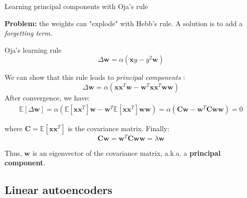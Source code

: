\documentclass[handout]{beamer}
\begin{document}
  \begin{frame}{Learning principal components with Oja's rule}

    \textbf{Problem:} the weights can "explode" with Hebb's rule. A solution is to add a \emph{forgetting term}.
    \pause

    \begin{block}{Oja's learning rule \cite{Oja1982}}
      \begin{equation*}
        \Delta \mathbf{w} = \alpha (\mathbf{x} y - y^2 \mathbf{w})
      \end{equation*}
    \end{block}
    \pause
    \scriptsize{
    We can show that this rule leads to \emph{principal components} \cite{Becker1991,Oja1992}: 
    \vspace{0cm}
    \begin{equation*}
      \Delta \mathbf{w} = \alpha (\mathbf{x} \mathbf{x}^T \mathbf{w} - \mathbf{w}^T \mathbf{x} \mathbf{x}^T \mathbf{w} \mathbf{w})
    \end{equation*}
    After convergence, we have:
    \begin{align*}
      \mathbb{E}\left[\Delta \mathbf{w}\right] = \alpha (\mathbb{E}\left[\mathbf{x} \mathbf{x}^T\right] \mathbf{w} - \mathbf{w}^T \mathbb{E}\left[\mathbf{x} \mathbf{x}^T\right] \mathbf{w} \mathbf{w}) = \alpha (\mathbf{C} \mathbf{w} - \mathbf{w}^T \mathbf{C} \mathbf{w} \mathbf{w}) = 0
    \end{align*}
    
    where $\mathbf{C} = \mathbb{E}\left[\mathbf{x} \mathbf{x}^T\right]$ is the covariance matrix. Finally:
    \vspace{0cm}
    \begin{equation*}
      \mathbf{C} \mathbf{w} = \mathbf{w}^T \mathbf{C} \mathbf{w} \mathbf{w} = \lambda \mathbf{w}
    \end{equation*}

    Thus, $\mathbf{w}$ is an eigenvector of the covariance matrix, a.k.a. a \textbf{principal component}.
    }

  \end{frame}

  \subsection{Linear autoencoders}
\end{document}
